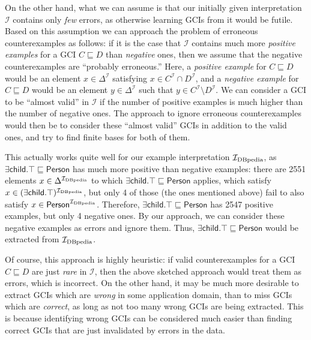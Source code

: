 On the other hand, what we can assume is that our initially given interpretation
$\mathcal{I}$ contains only \emph{few} errors, as otherwise learning GCIs from it would be
futile.  Based on this assumption we can approach the problem of erroneous counterexamples
as follows: if it is the case that $\mathcal{I}$ contains much more \emph{positive
  examples} for a GCI $C \sqsubseteq D$ than \emph{negative} ones, then we assume that the
negative counterexamples are ``probably erroneous.''  Here, a \emph{positive example} for
$C \sqsubseteq D$ would be an element $x \in \Delta^{\mathcal{I}}$ satisfying $x \in
C^{\mathcal{I}} \cap D^{\mathcal{I}}$, and a \emph{negative example} for $C \sqsubseteq D$
would be an element $y \in \Delta^{\mathcal{I}}$ such that $y \in C^{\mathcal{I}}
\setminus D^{\mathcal{I}}$.  We can consider a GCI to be ``almost valid'' in $\mathcal{I}$
if the number of positive examples is much higher than the number of negative ones.  The
approach to ignore erroneous counterexamples would then be to consider these ``almost
valid'' GCIs in addition to the valid ones, and try to find finite bases for both of them.

This actually works quite well for our example interpretation ${\mathcal{I}_{\text{DBpedia}}}$, as
$\mathsf{\exists child. \top \sqsubseteq Person}$ has much more positive than negative
examples: there are 2551 elements $x \in \Delta^{{\mathcal{I}_{\text{DBpedia}}}}$ to which $\mathsf{\exists
  child. \top \sqsubseteq Person}$ applies, \ie which satisfy $x \in (\mathsf{\exists
  child. \top})^{{\mathcal{I}_{\text{DBpedia}}}}$, but only 4 of those (the ones mentioned above) fail to also
satisfy $x \in \mathsf{Person}^{{\mathcal{I}_{\text{DBpedia}}}}$.  Therefore, $\mathsf{\exists child. \top
  \sqsubseteq Person}$ has 2547 positive examples, but only 4 negative ones.  By our
approach, we can consider these negative examples as errors and ignore them.  Thus,
$\mathsf{\exists child. \top \sqsubseteq Person}$ would be extracted from ${\mathcal{I}_{\text{DBpedia}}}$.

Of course, this approach is highly heuristic: if valid counterexamples for a GCI $C
\sqsubseteq D$ are just \emph{rare} in $\mathcal{I}$, then the above sketched approach
would treat them as errors, which is incorrect.  On the other hand, it may be much more
desirable to extract GCIs which are \emph{wrong} in some application domain, than to miss
GCIs which are \emph{correct}, as long as not too many wrong GCIs are being extracted.
This is because identifying wrong GCIs can be considered much easier than finding correct
GCIs that are just invalidated by errors in the data.

